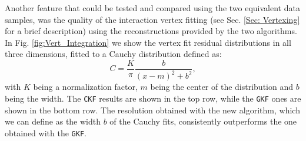Another feature that could be tested and compared using the two equivalent data samples, was the quality of the interaction vertex fitting (see Sec. \ref{Sec: Vertexing} for a brief description) using the reconstructions provided by the two algorithms. In Fig. \ref{fig:Vert_Integration} we show the vertex fit residual distributions in all three dimensions, fitted to a Cauchy distribution defined as:
\begin{equation}
    C=\frac{K}{\pi}\frac{b}{(x-m)^2+b^2},
\end{equation}
with $K$ being a normalization factor, $m$ being the center of the distribution and $b$ being the width. The \texttt{CKF} results are shown in the top row, while the \texttt{GKF} ones are shown in the bottom row. The resolution obtained with the new algorithm, which we can define as the width $b$ of the Cauchy fits, consistently outperforms the one obtained with the \texttt{GKF}. 



